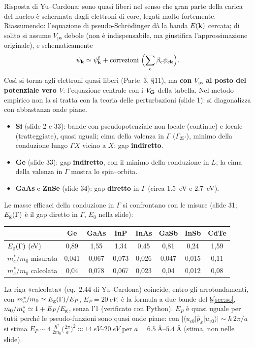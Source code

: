 \documentclass[11pt,a4paper]{article}
\begin{document}
Risposta di Yu--Cardona: sono quasi liberi nel senso che gran parte della carica del nucleo è schermata dagli elettroni di core, legati molto
fortemente. Riassumendo: l'equazione di pseudo-Schrödinger dà la banda $E(\mathbf k)$ cercata; di solito si assume $V_{\mathrm{ps}}$ debole (non è
indispensabile, ma giustifica l'approssimazione originale), e schematicamente
\[
\psi_{\vk}\simeq\psi^{\mathrm f}_{\vk}+\text{correzioni}\ \Bigl(\sum_c\beta_c\psi_{c\vk}\Bigr).
\]
Così si torna agli elettroni quasi liberi (Parte~3, §11), ma \textbf{con $V_{\mathrm{ps}}$ al posto del potenziale vero $V$}: l'equazione centrale con i
$V_{\mathbf G}$ della tabella. Nel metodo empirico non la si tratta con la teoria delle perturbazioni (slide 1): si diagonalizza con abbastanza onde piane.

\begin{itemize}[leftmargin=*]
\item \textbf{Si} (slide 2 e 33): bande con pseudopotenziale non locale (continue) e locale (tratteggiate), quasi uguali; cima della valenza in
$\Gamma$ ($\Gamma_{25'}$), minimo della conduzione lungo $\Gamma X$ vicino a $X$: gap \textbf{indiretto}.
\item \textbf{Ge} (slide 33): gap \textbf{indiretto}, con il minimo della conduzione in $L$; la cima della valenza in $\Gamma$ mostra lo spin--orbita.
\item \textbf{GaAs} e \textbf{ZnSe} (slide 34): gap \textbf{diretto} in $\Gamma$ (circa \SI{1.5}{eV} e \SI{2.7}{eV}).
\end{itemize}
Le masse efficaci della conduzione in $\Gamma$ si confrontano con le misure (slide 31; $E_{\mathrm g}(\Gamma)$ è il gap diretto in $\Gamma$, $E_0$ nella slide):
\begin{center}\small
\begin{tabular}{@{}lccccccc@{}}
\toprule
& Ge & GaAs & InP & InAs & GaSb & InSb & CdTe\\
\midrule
$E_{\mathrm g}(\Gamma)$ (eV) & 0,89 & 1,55 & 1,34 & 0,45 & 0,81 & 0,24 & 1,59\\
$m^*_c/m_0$ misurata & 0,041 & 0,067 & 0,073 & 0,026 & 0,047 & 0,015 & 0,11\\
$m^*_c/m_0$ calcolata & 0,04 & 0,078 & 0,067 & 0,023 & 0,04 & 0,012 & 0,08\\
\bottomrule
\end{tabular}
\end{center}
La riga «calcolata» (eq.~2.44 di Yu--Cardona) coincide, entro gli arrotondamenti, con $m^*_c/m_0\simeq E_{\mathrm g}(\Gamma)/E_P$, $E_P=\SI{20}{eV}$: è la formula a
due bande del §\ref{sec:so}, $m_0/m^*_c\simeq1+E_P/E_{\mathrm g}$, senza l'1 (verificato con Python). $E_P$ è quasi uguale per tutti perché le pseudo-funzioni
sono quasi onde piane: con $|\langle u_{c0}|\hat p_x|u_{v0}\rangle|\sim\hbar\,2\pi/a$ si stima $E_P\sim4\,\frac{\hbar^2}{2m_0}\bigl(\frac{2\pi}a\bigr)^2
\approx\SIrange{14}{20}{eV}$ per $a=\SIrange{6.5}{5.4}{\angstrom}$ (stima, non nelle slide).
\end{document}
